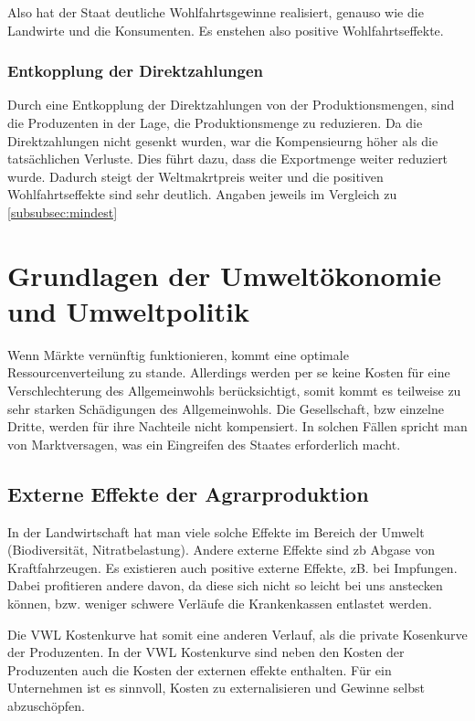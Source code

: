 \documentclass[11pt]{scrbook}
\begin{document}
Also hat der Staat deutliche Wohlfahrtsgewinne realisiert, genauso wie die Landwirte und die Konsumenten.
Es enstehen also positive Wohlfahrtseffekte.

\subsubsection{Entkopplung der Direktzahlungen}
Durch eine Entkopplung der Direktzahlungen von der Produktionsmengen, sind die Produzenten in der Lage, die Produktionsmenge zu reduzieren.
Da die Direktzahlungen nicht gesenkt wurden, war die Kompensieurng höher als die tatsächlichen Verluste.
Dies führt dazu, dass die Exportmenge weiter reduziert wurde.
Dadurch steigt der Weltmakrtpreis weiter und die positiven Wohlfahrtseffekte sind sehr deutlich.
Angaben jeweils im Vergleich zu \cref{subsubsec:mindest}


\setcounter{section}{0}
\section{Grundlagen der Umweltökonomie und Umweltpolitik}
Wenn Märkte vernünftig funktionieren, kommt eine optimale Ressourcenverteilung zu stande.
Allerdings werden per se keine Kosten für eine Verschlechterung des Allgemeinwohls berücksichtigt, somit kommt es teilweise zu sehr starken Schädigungen des Allgemeinwohls.
Die Gesellschaft, bzw einzelne Dritte, werden für ihre Nachteile nicht kompensiert.
In solchen Fällen spricht man von Marktversagen, was ein Eingreifen des Staates erforderlich macht.

\subsection{Externe Effekte der Agrarproduktion}
In der Landwirtschaft hat man viele solche Effekte im Bereich der Umwelt (Biodiversität, Nitratbelastung).
Andere externe Effekte sind zb Abgase von Kraftfahrzeugen.
Es existieren auch positive externe Effekte, zB. bei Impfungen.
Dabei profitieren andere davon, da diese sich nicht so leicht bei uns anstecken können, bzw. weniger schwere Verläufe die Krankenkassen entlastet werden.

Die \ac{VWL} Kostenkurve hat somit eine anderen Verlauf, als die private Kosenkurve der Produzenten.
In der \ac{VWL} Kostenkurve sind neben den Kosten der Produzenten auch die Kosten der externen effekte enthalten.
Für ein Unternehmen ist es sinnvoll, Kosten zu externalisieren und Gewinne selbst abzuschöpfen.
\end{document}
